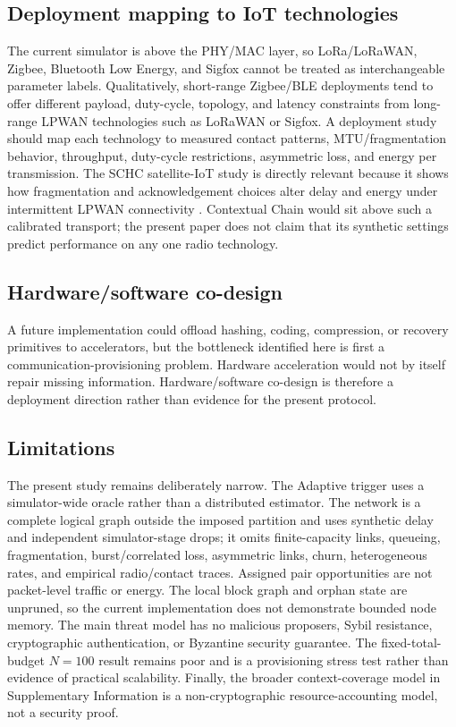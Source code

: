 \documentclass[11pt]{article}
\begin{document}
\subsection{Deployment mapping to IoT technologies}
The current simulator is above the PHY/MAC layer, so LoRa/LoRaWAN, Zigbee, Bluetooth Low Energy, and Sigfox cannot be treated as interchangeable parameter labels. Qualitatively, short-range Zigbee/BLE deployments tend to offer different payload, duty-cycle, topology, and latency constraints from long-range LPWAN technologies such as LoRaWAN or Sigfox. A deployment study should map each technology to measured contact patterns, MTU/fragmentation behavior, throughput, duty-cycle restrictions, asymmetric loss, and energy per transmission. The SCHC satellite-IoT study is directly relevant because it shows how fragmentation and acknowledgement choices alter delay and energy under intermittent LPWAN connectivity \cite{MunozLara2026SCHC}. Contextual Chain would sit above such a calibrated transport; the present paper does not claim that its synthetic settings predict performance on any one radio technology.

\subsection{Hardware/software co-design}
A future implementation could offload hashing, coding, compression, or recovery primitives to accelerators, but the bottleneck identified here is first a communication-provisioning problem. Hardware acceleration would not by itself repair missing information. Hardware/software co-design is therefore a deployment direction rather than evidence for the present protocol.

\subsection{Limitations}
The present study remains deliberately narrow. The Adaptive trigger uses a simulator-wide oracle rather than a distributed estimator. The network is a complete logical graph outside the imposed partition and uses synthetic delay and independent simulator-stage drops; it omits finite-capacity links, queueing, fragmentation, burst/correlated loss, asymmetric links, churn, heterogeneous rates, and empirical radio/contact traces. Assigned pair opportunities are not packet-level traffic or energy. The local block graph and orphan state are unpruned, so the current implementation does not demonstrate bounded node memory. The main threat model has no malicious proposers, Sybil resistance, cryptographic authentication, or Byzantine security guarantee. The fixed-total-budget $N=100$ result remains poor and is a provisioning stress test rather than evidence of practical scalability. Finally, the broader context-coverage model in Supplementary Information is a non-cryptographic resource-accounting model, not a security proof.
\end{document}
